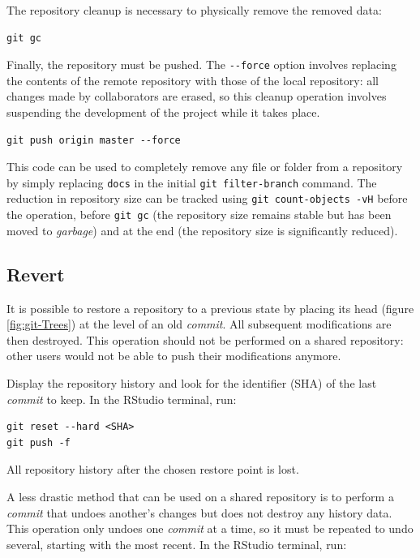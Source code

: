 \documentclass[
  12pt,
  american,
  a4paper,
  extrafontsizes,onecolumn,openright
  ]{memoir}
\newlength{\rf}
\begin{document}
The repository cleanup is necessary to physically remove the removed data:

\begin{verbatim}
git gc
\end{verbatim}

Finally, the repository must be pushed.
The \texttt{-\/-force} option involves replacing the contents of the remote repository with those of the local repository: all changes made by collaborators are erased, so this cleanup operation involves suspending the development of the project while it takes place.

\begin{verbatim}
git push origin master --force
\end{verbatim}

This code can be used to completely remove any file or folder from a repository by simply replacing \texttt{docs} in the initial \texttt{git\ filter-branch} command.
The reduction in repository size can be tracked using \texttt{git\ count-objects\ -vH} before the operation, before \texttt{git\ gc} (the repository size remains stable but has been moved to \emph{garbage}) and at the end (the repository size is significantly reduced).

\hypertarget{revert-1}{%
\subsection{Revert}\label{revert-1}}

It is possible to restore a repository to a previous state by placing its head (figure \ref{fig:git-Trees}) at the level of an old \emph{commit}.
All subsequent modifications are then destroyed.
This operation should not be performed on a shared repository: other users would not be able to push their modifications anymore.

Display the repository history and look for the identifier (SHA) of the last \emph{commit} to keep.
In the RStudio terminal, run:

\begin{verbatim}
git reset --hard <SHA>
git push -f
\end{verbatim}

All repository history after the chosen restore point is lost.

A less drastic method that can be used on a shared repository is to perform a \emph{commit} that undoes another's changes but does not destroy any history data.
This operation only undoes one \emph{commit} at a time, so it must be repeated to undo several, starting with the most recent.
In the RStudio terminal, run:
\end{document}
